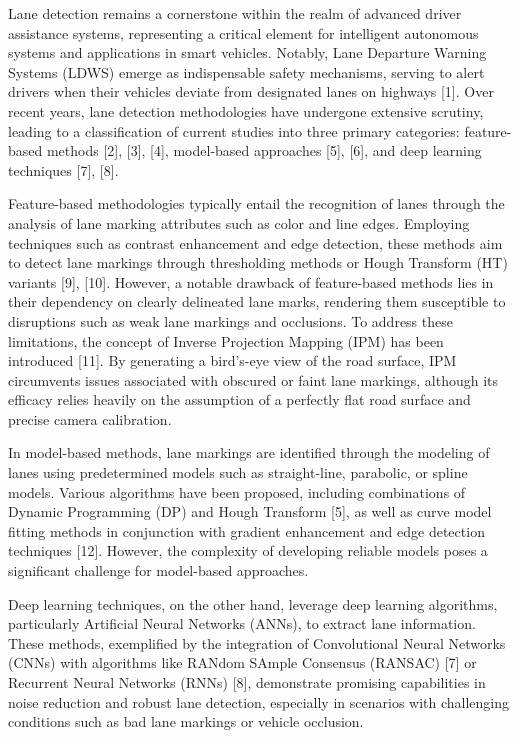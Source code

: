 Lane detection remains a cornerstone within the realm of advanced driver assistance systems, representing a critical element for intelligent autonomous systems and applications in smart vehicles. Notably, Lane Departure Warning Systems (LDWS) emerge as indispensable safety mechanisms, serving to alert drivers when their vehicles deviate from designated lanes on highways [1]. Over recent years, lane detection methodologies have undergone extensive scrutiny, leading to a classification of current studies into three primary categories: feature-based methods [2], [3], [4], model-based approaches [5], [6], and deep learning techniques [7], [8].

Feature-based methodologies typically entail the recognition of lanes through the analysis of lane marking attributes such as color and line edges. Employing techniques such as contrast enhancement and edge detection, these methods aim to detect lane markings through thresholding methods or Hough Transform (HT) variants [9], [10]. However, a notable drawback of feature-based methods lies in their dependency on clearly delineated lane marks, rendering them susceptible to disruptions such as weak lane markings and occlusions. To address these limitations, the concept of Inverse Projection Mapping (IPM) has been introduced [11]. By generating a bird's-eye view of the road surface, IPM circumvents issues associated with obscured or faint lane markings, although its efficacy relies heavily on the assumption of a perfectly flat road surface and precise camera calibration.

In model-based methods, lane markings are identified through the modeling of lanes using predetermined models such as straight-line, parabolic, or spline models. Various algorithms have been proposed, including combinations of Dynamic Programming (DP) and Hough Transform [5], as well as curve model fitting methods in conjunction with gradient enhancement and edge detection techniques [12]. However, the complexity of developing reliable models poses a significant challenge for model-based approaches.

Deep learning techniques, on the other hand, leverage deep learning algorithms, particularly Artificial Neural Networks (ANNs), to extract lane information. These methods, exemplified by the integration of Convolutional Neural Networks (CNNs) with algorithms like RANdom SAmple Consensus (RANSAC) [7] or Recurrent Neural Networks (RNNs) [8], demonstrate promising capabilities in noise reduction and robust lane detection, especially in scenarios with challenging conditions such as bad lane markings or vehicle occlusion.


